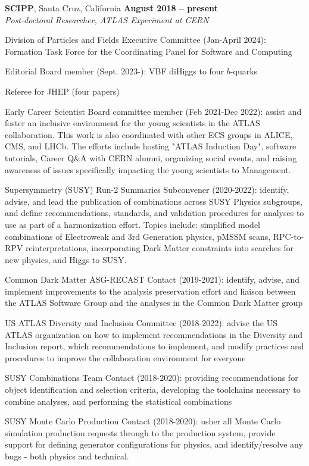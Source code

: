 \documentclass[margin,line]{resume}
\begin{document}
\begin{resume}
\textbf{SCIPP}, Santa Cruz, California \hfill \textbf{August 2018 -- present}\\
\textsl{Post-doctoral Researcher, ATLAS Experiment at CERN}
\begin{list2}
  \item Division of Particles and Fields Executive Committee (Jan-April 2024): Formation Task Force for the Coordinating Panel for Software and Computing
  \item Editorial Board member (Sept. 2023-): VBF diHiggs to four $b$-quarks
  \item Referee for JHEP (four papers)
  \item Early Career Scientist Board committee member (Feb 2021-Dec 2022): assist and foster an inclusive environment for the young scientists in the ATLAS collaboration. This work is also coordinated with other ECS groups in ALICE, CMS, and LHCb. The efforts include hosting "ATLAS Induction Day", software tutorials, Career Q\&A with CERN alumni, organizing social events, and raising awareness of issues specifically impacting the young scientists to Management.
  \item Supersymmetry (SUSY) Run-2 Summaries Subconvener (2020-2022): identify, advise, and lead the publication of combinations across SUSY Physics subgroups, and define recommendations, standards, and validation procedures for analyses to use as part of a harmonization effort. Topics include: simplified model combinations of Electroweak and 3rd Generation physics, pMSSM scans, RPC-to-RPV reinterpretations, incorporating Dark Matter constraints into searches for new physics, and Higgs to SUSY.
  \item Common Dark Matter ASG-RECAST Contact (2019-2021): identify, advise, and implement improvements to the analysis preservation effort and liaison between the ATLAS Software Group and the analyses in the Common Dark Matter group
  \item US ATLAS Diversity and Inclusion Committee (2018-2022): advise the US ATLAS organization on how to implement recommendations in the Diversity and Inclusion report, which recommendations to implement, and modify practices and procedures to improve the collaboration environment for everyone
  \item SUSY Combinations Team Contact (2018-2020): providing recommendations for object identification and selection criteria, developing the toolchains necessary to combine analyses, and performing the statistical combinations
  \item SUSY Monte Carlo Production Contact (2018-2020): usher all Monte Carlo simulation production requests through to the production system, provide support for defining generator configurations for physics, and identify/resolve any bugs - both physics and technical.

\end{list2}
\end{resume}
\end{document}
